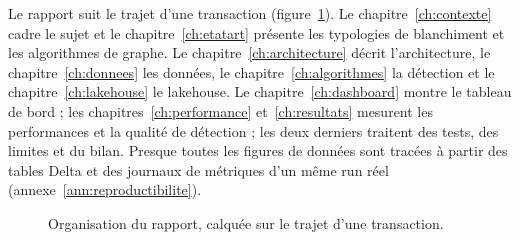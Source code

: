 Le rapport suit le trajet d'une transaction (figure~\ref{fig:plan}). Le
chapitre~\ref{ch:contexte} cadre le sujet et le chapitre~\ref{ch:etatart}
présente les typologies de blanchiment et les algorithmes de graphe. Le
chapitre~\ref{ch:architecture} décrit l'architecture, le
chapitre~\ref{ch:donnees} les données, le chapitre~\ref{ch:algorithmes} la
détection et le chapitre~\ref{ch:lakehouse} le lakehouse. Le
chapitre~\ref{ch:dashboard} montre le tableau de bord ; les
chapitres~\ref{ch:performance} et~\ref{ch:resultats} mesurent les performances
et la qualité de détection ; les deux derniers traitent des tests, des limites
et du bilan. Presque toutes les figures de données sont tracées à partir des
tables Delta et des journaux de métriques d'un même run réel
(annexe~\ref{ann:reproductibilite}).

\begin{figure}[htp]
\centering
{}
\caption{Organisation du rapport, calquée sur le trajet d'une transaction.}
\label{fig:plan}
\end{figure}
